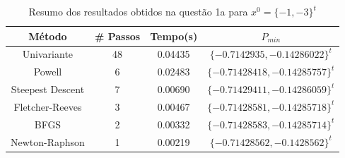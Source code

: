 \documentclass[10pt, a4paper]{article}
\begin{document}
\begin{table}[H]
  \begin{center}
    \begin{tabular}{c|c|c|c}
      \textbf{Método} & \textbf{\# Passos} & \textbf{Tempo(s)} & \textbf{$P_{min}$}\\
      \hline
      Univariante & 48 & 0.04435 & $\{-0.7142935, -0.14286022\}^t$\\
      Powell & 6 & 0.02483 & $\{-0.71428418, -0.14285757\}^t$\\
      Steepest Descent & 7 & 0.00690 & $\{-0.71429411, -0.14286059\}^t$\\
      Fletcher-Reeves & 3 & 0.00467 & $\{-0.71428581, -0.14285718\}^t$\\
      BFGS & 2 & 0.00332 & $\{-0.71428583, -0.14285714\}^t$\\
      Newton-Raphson & 1 & 0.00219 & $\{-0.71428562, -0.1428562\}^t$\\
    \end{tabular}
  \end{center}
  \caption{Resumo dos resultados obtidos na questão 1a para $x^0 = \{-1,-3\}^t$}
\end{table}




\end{document}
